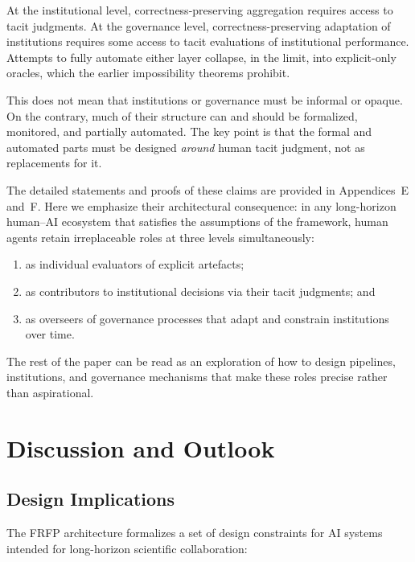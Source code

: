 At the institutional level, correctness-preserving aggregation requires access to tacit judgments. At the governance level, correctness-preserving adaptation of institutions requires some access to tacit evaluations of institutional performance. Attempts to fully automate either layer collapse, in the limit, into explicit-only oracles, which the earlier impossibility theorems prohibit.

This does not mean that institutions or governance must be informal or opaque. On the contrary, much of their structure can and should be formalized, monitored, and partially automated. The key point is that the formal and automated parts must be designed \emph{around} human tacit judgment, not as replacements for it.

The detailed statements and proofs of these claims are provided in Appendices~E and~F. Here we emphasize their architectural consequence: in any long-horizon human--AI ecosystem that satisfies the assumptions of the framework, human agents retain irreplaceable roles at three levels simultaneously:
\begin{enumerate}
  \item as individual evaluators of explicit artefacts;
  \item as contributors to institutional decisions via their tacit judgments; and
  \item as overseers of governance processes that adapt and constrain institutions over time.
\end{enumerate}
The rest of the paper can be read as an exploration of how to design pipelines, institutions, and governance mechanisms that make these roles precise rather than aspirational.

\section{Discussion and Outlook}
\label{sec:discussion}

\subsection{Design Implications}

The FRFP architecture formalizes a set of design constraints for AI
systems intended for long-horizon scientific collaboration:

